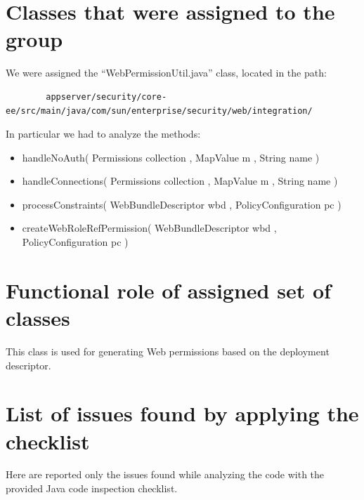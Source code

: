 \documentclass[a4paper,11pt]{report} %
\begin{document}
	\section{Classes that were assigned to the group} We were assigned the ``WebPermissionUtil.java'' class, located in the path:\
	\begin{verbatim}
		appserver/security/core-ee/src/main/java/com/sun/enterprise/security/web/integration/
	\end{verbatim}
	\bigskip
	In particular we had to analyze the methods:
	\begin{itemize}
		\item handleNoAuth( Permissions collection , MapValue m , String name )
		\item handleConnections( Permissions collection , MapValue m , String name )
		\item processConstraints( WebBundleDescriptor wbd , PolicyConfiguration pc )
		\item createWebRoleRefPermission( WebBundleDescriptor wbd , PolicyConfiguration pc )
	\end{itemize}
	
	\section{Functional role of assigned set of classes} This class is used for generating Web permissions based on the deployment descriptor.
	
	
	\section{List of issues found by applying the checklist} Here are reported only the issues found while analyzing the code with the provided Java code inspection checklist.
\end{document}
